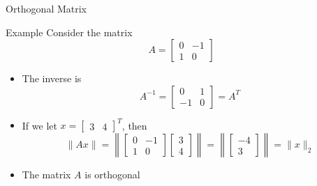 \documentclass[10pt]{beamer}
\begin{document}
\begin{frame}{Orthogonal Matrix}

\begin{block}{Example}
    Consider the matrix 
    $$A=
    \begin{bmatrix}
        0 & -1\\ 1 & 0
    \end{bmatrix}
    $$
\end{block}
\begin{itemize}
    \item The inverse is 
    $$
    A^{-1} = \begin{bmatrix}
        0 & 1\\ -1 & 0
    \end{bmatrix} = A^T
    $$

    \item If we let $x = \begin{bmatrix}
        3&4
    \end{bmatrix}^T$, then
    $$
        \| Ax\| = \left\| \begin{bmatrix}
            0 &  -1\\
            1 & 0
        \end{bmatrix} \begin{bmatrix}
            3\\4
        \end{bmatrix}\right\|= \left\| \begin{bmatrix}
            -4\\3
        \end{bmatrix}\right\| = \|x\|_2  
    $$
    \item The matrix $A$ is orthogonal
    
\end{itemize}
    
\end{frame}




\end{document}
